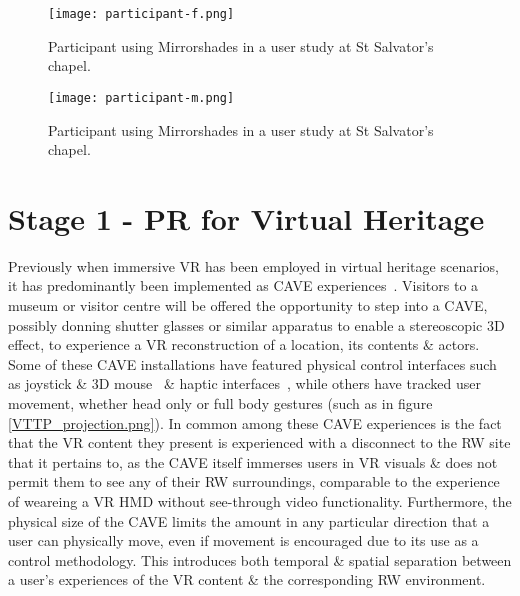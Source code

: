 \begin{figure}[ht]
	\begin{center}
		\texttt{[image: participant-f.png]}
		\caption{Participant using Mirrorshades in a user study at St Salvator's chapel.}
		\label{participant-f.png}
	\end{center}
\end{figure}

\begin{figure}[ht]
	\begin{center}
		\texttt{[image: participant-m.png]}
		\caption{Participant using Mirrorshades in a user study at St Salvator's chapel.}
		\label{participant-m.png}
	\end{center}
\end{figure}


\section{Stage 1 - PR for Virtual Heritage}

Previously when immersive VR has been employed in virtual heritage scenarios, it has predominantly been implemented as CAVE experiences~\cite{Roussou2002}. Visitors to a museum or visitor centre will be offered the opportunity to step into a CAVE, possibly donning shutter glasses or similar apparatus to enable a stereoscopic 3D effect, to experience a VR reconstruction of a location, its contents \& actors. Some of these CAVE installations have featured physical control interfaces such as joystick \& 3D mouse~\cite{cabral:x3dexperience} \& haptic interfaces~\cite{Christou2006}, while others have tracked user movement, whether head only or full body  gestures (such as in figure \ref{VTTP_projection.png}). In common among these CAVE experiences is the fact that the VR content they present is experienced with a disconnect to the RW site that it pertains to, as the CAVE itself immerses users in VR visuals \& does not permit them to see any of their RW surroundings, comparable to the experience of weareing a VR HMD without see-through video functionality. Furthermore, the physical size of the CAVE limits the amount in any particular direction that a user can physically move, even if movement is encouraged due to its use as a control methodology. This introduces both temporal \& spatial separation between a user's experiences of the VR content \& the corresponding RW environment.

